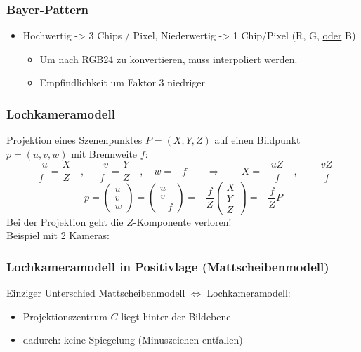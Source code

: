 \subsubsection*{Bayer-Pattern}

\begin{itemize}
\item Hochwertig -> 3 Chips / Pixel, Niederwertig -> 1 Chip/Pixel (R, G, \underline{oder} B)
\begin{itemize}
\item Um nach RGB24 zu konvertieren, muss interpoliert werden.
\item Empfindlichkeit um Faktor 3 niedriger
\end{itemize}
\end{itemize}


\subsubsection*{Lochkameramodell}


Projektion eines Szenenpunktes $P = (X,Y,Z)$ auf einen Bildpunkt $p = (u,v,w)$ mit Brennweite $f$:
$$\frac{-u}{f} = \frac{X}{Z} \quad , \quad \frac{-v}{f} = \frac{Y}{Z} \quad , \quad w = -f \qquad \Rightarrow \qquad X = - \frac{uZ}{f} \quad , \quad - \frac{vZ}{f}$$
$$p = \left( \begin{array}{c} u \\ v \\ w \end{array} \right) = \left( \begin{array}{c} u \\ v \\ -f \end{array} \right) = - \frac{f}{Z} \left( \begin{array}{c} X \\ Y \\ Z \end{array} \right) = - \frac{f}{Z} P$$
Bei der Projektion geht die $Z$-Komponente verloren! \\
Beispiel mit 2 Kameras:

\subsubsection*{Lochkameramodell in Positivlage (Mattscheibenmodell)}

Einziger Unterschied Mattscheibenmodell $\Leftrightarrow$ Lochkameramodell:
\begin{itemize}
\item Projektionszentrum $C$ liegt hinter der Bildebene
\item dadurch: keine Spiegelung (Minuszeichen entfallen)
\end{itemize}

